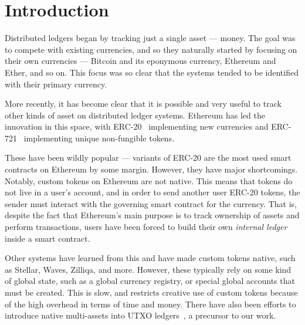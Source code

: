 \section{Introduction}
\label{sec:intro}



Distributed ledgers began by tracking just a single asset --- money.
The goal was to compete with existing currencies, and so they naturally started by focusing on their own currencies --- Bitcoin and its eponymous currency, Ethereum and Ether, and so on.
This focus was so clear that the systems tended to be identified with their primary currency.

More recently, it has become clear that it is possible and very useful to track other kinds of asset on distributed ledger systems.
Ethereum has led the innovation in this space, with ERC-20~\cite{erc20} implementing new currencies and ERC-721~\cite{erc721} implementing unique non-fungible tokens.

These have been wildly popular --- variants of ERC-20 are the most used smart contracts on Ethereum by some margin.
However, they have major shortcomings.
Notably, custom tokens on Ethereum are not native. This means that tokens do not live in a user's account, and in order to send another user ERC-20 tokens, the sender must interact with the governing smart contract for the currency.
That is, despite the fact that Ethereum's main purpose is to track ownership of assets and perform transactions, users have been forced to build their own \emph{internal ledger} inside a smart contract.

Other systems have learned from this and have made custom tokens native, such as Stellar, Waves,
Zilliqa, and more.
However, these typically rely on some kind of global state, such as a global currency registry, or special global accounts that must be created.
This is slow, and restricts creative use of custom tokens because of the high overhead in terms of time and money.
There have also been efforts to introduce native multi-assets into UTXO ledgers~\cite{mcledgers}, a precursor to our work.

